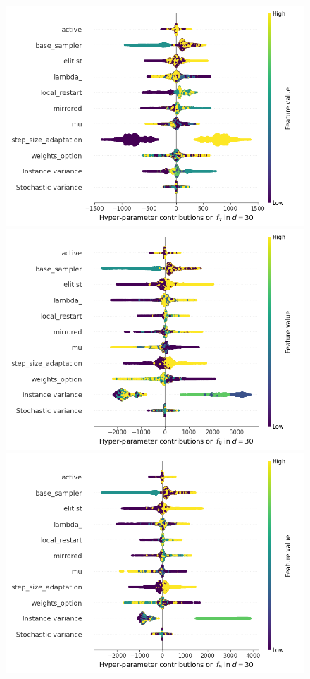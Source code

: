\begin{figure}[t]
	\includegraphics[height=0.15\textheight,trim=60mm 0mm 30mm 0mm,clip]{cma_img_new/img_summary_f7_d30.png}
	\includegraphics[height=0.15\textheight,trim=60mm 0mm 0mm 0mm,clip]{cma_img_new/img_summary_f8_d30.png}
	\includegraphics[height=0.15\textheight,trim=0mm 0mm 30mm 0mm,clip]{cma_img_new/img_summary_f9_d30.png}

\end{figure}

